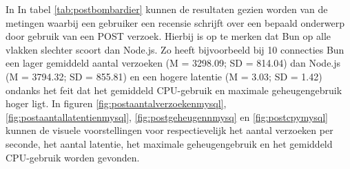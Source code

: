 In In tabel \ref{tab:postbombardier} kunnen de resultaten gezien worden van de metingen waarbij 
een gebruiker een recensie schrijft over een bepaald onderwerp door gebruik van een POST verzoek.
Hierbij is op te merken dat Bun op alle vlakken slechter scoort dan Node.js. Zo heeft bijvoorbeeld bij 10 connecties Bun
een lager gemiddeld aantal verzoeken (M = 3298.09; SD = 814.04) dan Node.js (M = 3794.32; SD = 855.81) en een hogere latentie (M = 3.03; SD = 1.42) 
ondanks het feit dat het gemiddeld CPU-gebruik en maximale geheugengebruik hoger ligt.
In figuren \ref{fig:postaantalverzoekenmysql}, \ref{fig:postaantallatentienmysql}, \ref{fig:postgeheugennmysq} en \ref{fig:postcpymysql} kunnen de visuele voorstellingen 
voor respectievelijk het aantal verzoeken per seconde, het aantal latentie, het maximale geheugengebruik en het gemiddeld CPU-gebruik worden gevonden.
